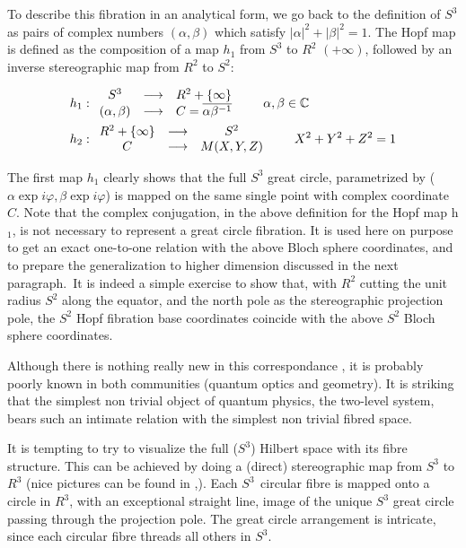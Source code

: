 \documentclass{amsart}
\begin{document}
To describe this fibration in an analytical form, we go back to the definition
of $S^{3}$ as pairs of complex numbers $\left(  \alpha,\beta\right)  $ which
satisfy $\left|  \alpha\right|  ^{2}+\left|  \beta\right|  ^{2}=1$. The Hopf
map is defined as the composition of a map $h_{1}$ from $S^{3}$ to $R^{2}$
$(+\infty)$, followed by an inverse stereographic map from $R^{2}$ to $S^{2}:$%

\begin{align}
h_{1}  &  :%
\begin{array}
[c]{ccc}%
S^{3} & \longrightarrow &  R^{2}+\left\{  \infty\right\} \\
\left(  \alpha,\beta\right)  & \longrightarrow &  C=\overline{\alpha\beta
^{-1}}%
\end{array}
\qquad\alpha,\beta\in\mathbb{C}\nonumber\\
h_{2}  &  :%
\begin{array}
[c]{ccc}%
R^{2}+\left\{  \infty\right\}  & \longrightarrow &  S^{2}\\
C & \longrightarrow &  M(X,Y,Z)
\end{array}
\qquad X^{2}+Y^{2}+Z^{2}=1
\end{align}

The first map $h_{1}$ clearly shows that the full $S^{3}$ great circle,
parametrized by ($\alpha\exp i\varphi,\beta\exp i\varphi$) is mapped on the
same single point with complex coordinate $C$. Note that the complex
conjugation, in the above definition for the Hopf map h$_{1}$, is not
necessary to represent a great circle fibration. It is used here on purpose to
get an exact one-to-one relation with the above Bloch sphere coordinates, and
to prepare the generalization to higher dimension discussed in the next
paragraph.\ It is indeed a simple exercise to show that, with $R^{2}$ cutting
the unit radius $S^{2}$ along the equator, and the north pole as the
stereographic projection pole, the $S^{2}$ Hopf fibration base coordinates
coincide with the above $S^{2}$ Bloch sphere coordinates.

Although there is nothing really new in this correspondance \cite{urtbanke},
it is probably poorly known in both communities (quantum optics and geometry).
It is striking that the simplest non trivial object of quantum physics, the
two-level system, bears such an intimate relation with the simplest non
trivial fibred space.

It is tempting to try to visualize the full ($S^{3}$) Hilbert space with its
fibre structure. This can be achieved by doing a (direct) stereographic map
from $S^{3}$ to $R^{3}$ (nice pictures can be found in \cite{urtbanke}%
,\cite{sadoc_mosseri_livre}). Each $S^{3\text{ }}$circular fibre is mapped
onto a circle in $R^{3}$, with an exceptional straight line, image of the
unique $S^{3}$ great circle passing through the projection pole. The great
circle arrangement is intricate, since each circular fibre threads all others
in $S^{3}$.
\end{document}

